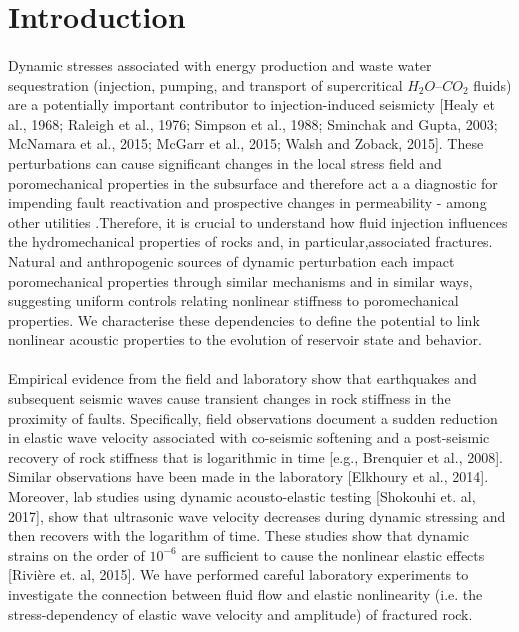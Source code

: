 \documentclass[letterpaper,10pt]{article}
\begin{document}

\section{Introduction}
\paragraph{} Dynamic stresses associated with energy production and waste water sequestration (injection, pumping, and transport of supercritical $H_{2}O$--$CO_{2}$ fluids) are a potentially important contributor to injection-induced seismicty [Healy et al., 1968; Raleigh et al., 1976; Simpson et al., 1988; Sminchak and Gupta, 2003; McNamara et al., 2015; McGarr et al., 2015; Walsh and Zoback, 2015]. These perturbations can cause significant changes in the local stress field and poromechanical properties in the subsurface and therefore act a a diagnostic for impending fault reactivation and prospective changes in permeability - among other utilities .Therefore, it is crucial to understand how fluid injection influences the hydromechanical properties of rocks and, in particular,associated fractures. Natural and anthropogenic sources of dynamic perturbation each impact poromechanical properties through similar mechanisms and in similar ways, suggesting uniform controls relating nonlinear stiffness to poromechanical properties. We characterise these dependencies to define the potential to link nonlinear acoustic properties to the evolution of reservoir state and behavior.

\paragraph{}
 Empirical evidence from the field and laboratory show that earthquakes and subsequent seismic waves cause transient changes in rock stiffness in the proximity of faults. Specifically, field observations document a sudden reduction in elastic wave velocity associated with co-seismic softening and a post-seismic recovery of rock stiffness that is logarithmic in time [e.g., Brenquier et al., 2008]. Similar observations have been made in the laboratory [Elkhoury et al., 2014]. Moreover, lab studies using dynamic acousto-elastic testing [Shokouhi et. al, 2017], show that ultrasonic wave velocity decreases during dynamic stressing and then recovers with the logarithm of time. These studies show that dynamic strains on the order of $10^{-6}$ are sufficient to cause the nonlinear elastic effects [Rivi\`ere et. al, 2015]. We have performed careful laboratory experiments to investigate the connection between fluid flow and elastic nonlinearity (i.e. the stress-dependency of elastic wave velocity and amplitude) of fractured rock.
\end{document}
